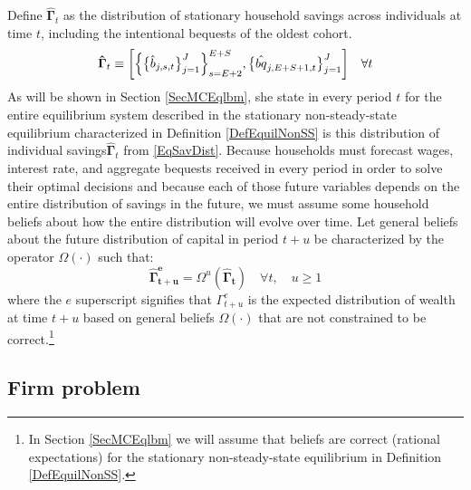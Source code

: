 \documentclass[letterpaper,12pt]{article}
\theoremstyle{definition}
\begin{document}
\begin{spacing}{1.5}
    Define $\bm{\hat{\Gamma}}_t$ as the distribution of stationary household savings across individuals at time $t$, including the intentional bequests of the oldest cohort.
    \begin{equation}\label{EqSavDist}
      \bm{\hat{\Gamma}}_t \equiv \biggl[\Bigl\{\bigl\{\hat{b}_{j,s,t}\bigr\}_{j=1}^J\Bigr\}_{s=E+2}^{E+S},\bigl\{\hat{bq}_{j,E+S+1,t}\bigr\}_{j=1}^J\biggr] \quad\forall t
    \end{equation}
    As will be shown in Section \ref{SecMCEqlbm}, she state in every period $t$ for the entire equilibrium system described in the stationary non-steady-state equilibrium characterized in Definition \ref{DefEquilNonSS} is this distribution of individual savings$\bm{\hat{\Gamma}}_t$ from \eqref{EqSavDist}. Because households must forecast wages, interest rate, and aggregate bequests received in every period in order to solve their optimal decisions and because each of those future variables depends on the entire distribution of savings in the future, we must assume some household beliefs about how the entire distribution will evolve over time. Let general beliefs about the future distribution of capital in period $t+u$ be characterized by the operator $\Omega(\cdot)$ such that:
    \begin{equation}\label{EqBeliefs}
      \bm{\hat{\Gamma}^e_{t+u}} = \Omega^u\left(\bm{\hat{\Gamma}_t}\right) \quad \forall t, \quad u\geq 1
    \end{equation}
    where the $e$ superscript signifies that $\Gamma^e_{t+u}$ is the expected distribution of wealth at time $t+u$ based on general beliefs $\Omega(\cdot)$ that are not constrained to be correct.\footnote{In Section \ref{SecMCEqlbm} we will assume that beliefs are correct (rational expectations) for the stationary non-steady-state equilibrium in Definition \ref{DefEquilNonSS}.}


  \subsection{Firm problem}\label{SecFirms}


\end{spacing}
\end{document}
